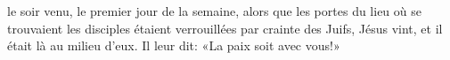 \encetemps le soir venu, le premier jour de la semaine,
	alors que les portes du lieu où se trouvaient les disciples
		étaient verrouillées par crainte des Juifs,
	Jésus vint, et il était là au milieu d’eux.
Il leur dit: «La paix soit avec vous!»

